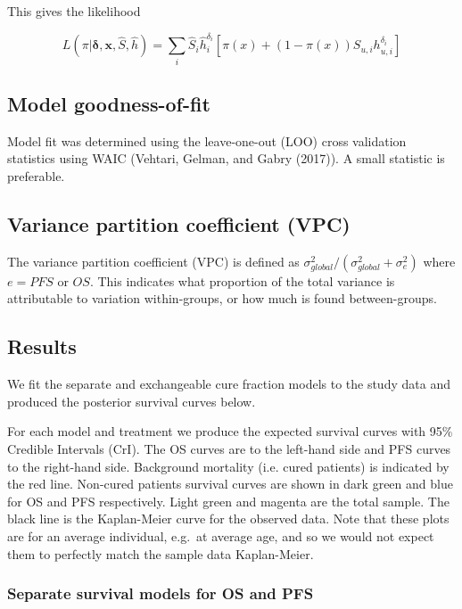 \documentclass[
]{article}
\begin{document}
This gives the likelihood

\[
L(\pi | \boldsymbol{\delta}, \boldsymbol{x}, \hat{S}, \hat{h}) =
\sum_i \hat{S}_i \hat{h}_i^{\delta_i} \left[ \pi(x) + (1 - \pi(x)) S_{u, i} h_{u , i}^{\delta_i} \right]
\]

\hypertarget{model-goodness-of-fit}{%
\subsection{Model goodness-of-fit}\label{model-goodness-of-fit}}

Model fit was determined using the leave-one-out (LOO) cross validation
statistics using WAIC (Vehtari, Gelman, and Gabry (2017)). A small
statistic is preferable.

\hypertarget{variance-partition-coefficient-vpc}{%
\subsection{Variance partition coefficient
(VPC)}\label{variance-partition-coefficient-vpc}}

The variance partition coefficient (VPC) is defined as
\(\sigma_{global}^2/ (\sigma_{global}^2 + \sigma_{e}^2)\) where
\(e = PFS\) or \(OS\). This indicates what proportion of the total
variance is attributable to variation within-groups, or how much is
found between-groups.

\hypertarget{results}{%
\subsection{Results}\label{results}}

We fit the separate and exchangeable cure fraction models to the study
data and produced the posterior survival curves below.

For each model and treatment we produce the expected survival curves
with 95\% Credible Intervals (CrI). The OS curves are to the left-hand
side and PFS curves to the right-hand side. Background mortality (i.e.
cured patients) is indicated by the red line. Non-cured patients
survival curves are shown in dark green and blue for OS and PFS
respectively. Light green and magenta are the total sample. The black
line is the Kaplan-Meier curve for the observed data. Note that these
plots are for an average individual, e.g.~at average age, and so we
would not expect them to perfectly match the sample data Kaplan-Meier.

\hypertarget{separate-survival-models-for-os-and-pfs}{%
\subsubsection{Separate survival models for OS and
PFS}\label{separate-survival-models-for-os-and-pfs}}
\end{document}
